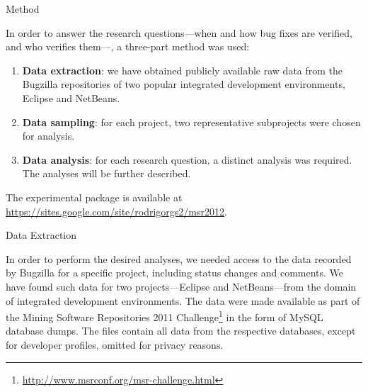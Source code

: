 \begin{section}{Method} \label{sec:methods}


	In order to answer the research questions---when and how bug fixes are verified, and who verifies them---, a three-part method was used:
	
	\begin{enumerate}
		\item \textbf{Data extraction}: we have obtained publicly available raw data from the Bugzilla repositories of two popular integrated development environments, Eclipse and NetBeans.

		\item \textbf{Data sampling}: for each project, two representative subprojects were chosen for analysis.
		
		
		
		\item \textbf{Data analysis}: for each research question, a distinct analysis was required. The analyses will be further described.
	\end{enumerate}	
	
	The experimental package is available at \url{https://sites.google.com/site/rodrigorgs2/msr2012}.

\begin{subsection}{Data Extraction}
	
	In order to perform the desired analyses, we needed access to the data recorded by Bugzilla for a specific project, including status changes and comments. We have found such data for two projects---Eclipse and NetBeans---from the domain of integrated development environments. The data were made available as part of the Mining Software Repositories 2011 Challenge\footnote{\url{http://www.msrconf.org/msr-challenge.html}} in the form of MySQL database dumps. The files contain all data from the respective databases, except for developer profiles, omitted for privacy reasons.
	

\end{subsection}
\end{section}
